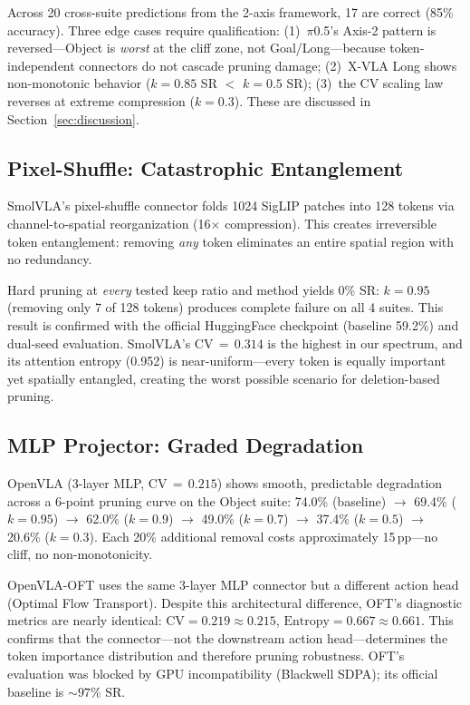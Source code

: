 \documentclass[10pt,twocolumn]{article}
\begin{document}
Across 20 cross-suite predictions from the 2-axis framework, 17 are correct (85\% accuracy).
Three edge cases require qualification:
(1)~$\pi$0.5's Axis-2 pattern is reversed---Object is \emph{worst} at the cliff zone, not Goal/Long---because token-independent connectors do not cascade pruning damage;
(2)~X-VLA Long shows non-monotonic behavior ($k\!=\!0.85$ SR $<$ $k\!=\!0.5$ SR);
(3)~the CV scaling law reverses at extreme compression ($k\!=\!0.3$).
These are discussed in Section~\ref{sec:discussion}.

\subsection{Pixel-Shuffle: Catastrophic Entanglement}
\label{sec:pixelshuffle}

SmolVLA's pixel-shuffle connector folds 1024 SigLIP patches into 128 tokens via channel-to-spatial reorganization (16$\times$ compression).
This creates irreversible token entanglement: removing \emph{any} token eliminates an entire spatial region with no redundancy.

Hard pruning at \emph{every} tested keep ratio and method yields 0\% SR:
$k\!=\!0.95$ (removing only 7 of 128 tokens) produces complete failure on all 4 suites.
This result is confirmed with the official HuggingFace checkpoint (baseline 59.2\%) and dual-seed evaluation.
SmolVLA's CV$\,=\,0.314$ is the highest in our spectrum, and its attention entropy (0.952) is near-uniform---every token is equally important yet spatially entangled, creating the worst possible scenario for deletion-based pruning.

\subsection{MLP Projector: Graded Degradation}
\label{sec:mlp}

OpenVLA (3-layer MLP, CV$\,=\,0.215$) shows smooth, predictable degradation across a 6-point pruning curve on the Object suite: 74.0\% (baseline) $\to$ 69.4\% ($k\!=\!0.95$) $\to$ 62.0\% ($k\!=\!0.9$) $\to$ 49.0\% ($k\!=\!0.7$) $\to$ 37.4\% ($k\!=\!0.5$) $\to$ 20.6\% ($k\!=\!0.3$).
Each 20\% additional removal costs approximately 15\,pp---no cliff, no non-monotonicity.

OpenVLA-OFT uses the same 3-layer MLP connector but a different action head (Optimal Flow Transport).
Despite this architectural difference, OFT's diagnostic metrics are nearly identical: $\text{CV}=0.219\approx 0.215$, $\text{Entropy}=0.667\approx 0.661$.
This confirms that the connector---not the downstream action head---determines the token importance distribution and therefore pruning robustness.
OFT's evaluation was blocked by GPU incompatibility (Blackwell SDPA); its official baseline is ${\sim}97\%$ SR.
\end{document}
